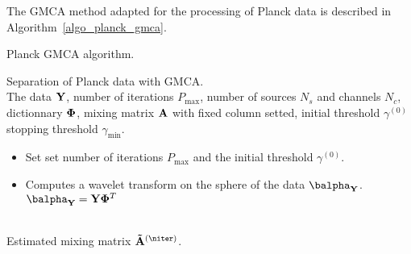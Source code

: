 The GMCA method adapted for the processing of Planck data is described in Algorithm~\ref{algo_planck_gmca}.
{\linespread{1}
\begin{algorithm}[htb]
\caption{Planck GMCA algorithm.}
\label{algo_planck_gmca}
 Separation of Planck data with GMCA.\\
 The data $\bf Y$, number of iterations $P_{\max}$, number of sources $N_s$ and channels $N_c$, dictionnary ${\bf \Phi}$, 
mixing matrix $\bf A$ with fixed column setted, initial threshold $\gamma^{(0)}$ stopping threshold ${\gamma_{\min}}$.\\
\begin{itemize}
\item Set set number of iterations $P_{\max}$ and the initial threshold $\gamma^{(0)}$.
\item Computes a wavelet transform on the sphere of the data ${\bf \balpha_Y}$.\\
${\bf \balpha_Y} = {\bf Y} {\bf \Phi}^T$
\end{itemize}
 \\
 Estimated mixing matrix ${\bf \tilde{A}}^{(\niter)}$.
\end{algorithm}}

